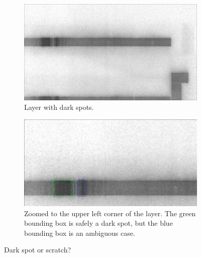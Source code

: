 \begin{figure}[ht]
  \centering

  \begin{subfigure}{\textwidth}
    \includegraphics[width=\textwidth]{images/layer_dark_scratch}
    \caption{Layer with dark spots.}

  \end{subfigure}

  \begin{subfigure}{\textwidth}
    \includegraphics[width=\textwidth]{images/layer_dark_scratch_cropped}
    \caption{Zoomed to the upper left corner of the layer. The green bounding box is safely a dark spot, but the blue bounding box is an ambiguous case.}
  \end{subfigure}

  \caption{Dark spot or scratch?}
  \label{fig:layer_dark_scratch}


\end{figure}

